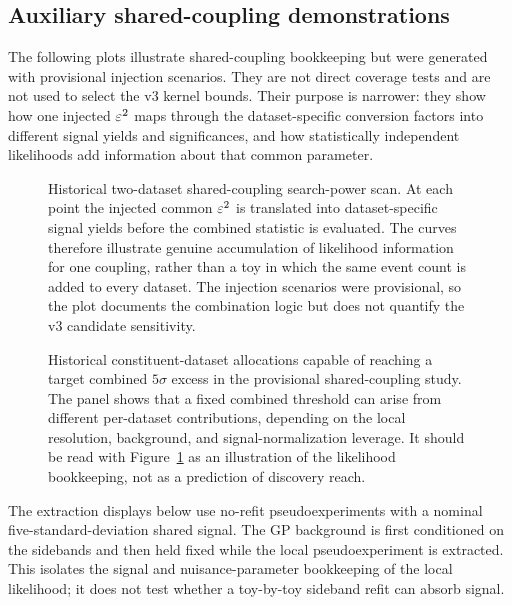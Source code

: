 \FloatBarrier

\subsection{Auxiliary shared-coupling demonstrations}

The following plots illustrate shared-coupling bookkeeping but were generated with
provisional injection scenarios. They are not direct \CLs{} coverage tests and are not
used to select the v3 kernel bounds. Their purpose is narrower: they show how one
injected $\varepsilon^2$ maps through the dataset-specific conversion factors into different
signal yields and significances, and how statistically independent likelihoods add
information about that common parameter.

\begin{figure}[p]
\centering
{}
\caption{Historical two-dataset shared-coupling search-power scan. At each point the
injected common $\varepsilon^2$ is translated into dataset-specific signal yields before the
combined statistic is evaluated. The curves therefore illustrate genuine accumulation
of likelihood information for one coupling, rather than a toy in which the same event
count is added to every dataset. The injection scenarios were provisional, so the
plot documents the combination logic but does not quantify the v3 candidate
sensitivity.}
\label{fig:app-combined-search-power}
\end{figure}

\begin{figure}[p]
\centering
{}
\caption{Historical constituent-dataset allocations capable of reaching a target
combined $5\sigma$ excess in the provisional shared-coupling study. The panel shows
that a fixed combined threshold can arise from different per-dataset contributions,
depending on the local resolution, background, and signal-normalization leverage.
It should be read with Figure~\ref{fig:app-combined-search-power} as an illustration
of the likelihood bookkeeping, not as a prediction of discovery reach.}
\label{fig:app-combined-search-power-constituents}
\end{figure}

The extraction displays below use no-refit pseudoexperiments with a nominal
five-standard-deviation shared signal. The GP background is first conditioned on the
sidebands and then held fixed while the local pseudoexperiment is extracted. This
isolates the signal and nuisance-parameter bookkeeping of the local likelihood; it
does not test whether a toy-by-toy sideband refit can absorb signal.

